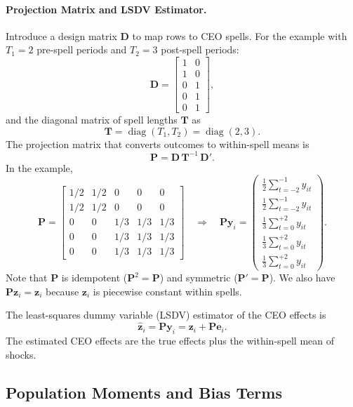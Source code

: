 \documentclass[11pt,a4paper]{article}
\begin{document}
\paragraph{Projection Matrix and LSDV Estimator.} Introduce a design matrix $\mathbf D$ to map rows to CEO spells. For the example with $T_1=2$ pre-spell periods and $T_2=3$ post-spell periods:
\[
  \mathbf D = \begin{bmatrix}
    1 & 0\\
    1 & 0\\
    0 & 1\\
    0 & 1\\
    0 & 1
  \end{bmatrix},
\]
and the diagonal matrix of spell lengths $\mathbf T$ as
$$
  \mathbf T = \operatorname{diag}(T_1,T_2)=\operatorname{diag}(2,3).
$$
The projection matrix that converts outcomes to within-spell means is
$$
  \mathbf P = \mathbf D\,\mathbf T^{-1}\,\mathbf D'.
$$
In the example,
\[
  \mathbf P = \begin{bmatrix}
    1/2 & 1/2 & 0 & 0 & 0\\
    1/2 & 1/2 & 0 & 0 & 0\\
    0 & 0 & 1/3 & 1/3 & 1/3\\
    0 & 0 & 1/3 & 1/3 & 1/3\\
    0 & 0 & 1/3 & 1/3 & 1/3
  \end{bmatrix}\quad\Rightarrow\quad
  \mathbf {Py}_i = 
  \begin{pmatrix}
  \frac12 \sum_{t=-2}^{-1} y_{it} \\
  \frac12 \sum_{t=-2}^{-1} y_{it} \\
  \frac13 \sum_{t=0}^{+2} y_{it}\\
  \frac13 \sum_{t=0}^{+2} y_{it}\\
  \frac13 \sum_{t=0}^{+2} y_{it}
  \end{pmatrix}.
\]
Note that $\mathbf P$ is idempotent ($\mathbf P^2=\mathbf P$) and symmetric ($\mathbf P'=\mathbf P$). We also have $\mathbf P\mathbf z_i = \mathbf z_i$ because $\mathbf z_i$ is piecewise constant within spells.

The least-squares dummy variable (LSDV) estimator of the CEO effects is
\begin{equation}\label{eq:lsdv_appendix}
  \hat{\mathbf z}_i = \mathbf P\mathbf y_i = \mathbf z_i + \mathbf P\mathbf e_i.
\end{equation}  
The estimated CEO effects are the true effects plus the within-spell mean of shocks.

\subsection{Population Moments and Bias Terms}
\end{document}
